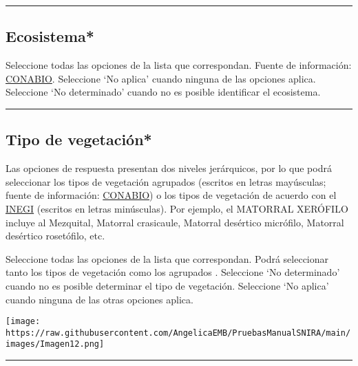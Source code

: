 \documentclass[
]{book}
\begin{document}
\begin{center}\rule{0.5\linewidth}{0.5pt}\end{center}

\hypertarget{ecosistema}{%
\subsection*{\texorpdfstring{{Ecosistema*}}{Ecosistema*}}\label{ecosistema}}

Seleccione todas las opciones de la lista que correspondan.
Fuente de información: \href{https://www.biodiversidad.gob.mx/ecosistemas/ecosismex}{CONABIO}.
Seleccione `No aplica' cuando ninguna de las opciones aplica.
Seleccione `No determinado' cuando no es posible identificar el ecosistema.

\begin{center}\rule{0.5\linewidth}{0.5pt}\end{center}

\hypertarget{tipo-de-vegetaciuxf3n}{%
\subsection*{\texorpdfstring{{Tipo de vegetación*}}{Tipo de vegetación*}}\label{tipo-de-vegetaciuxf3n}}

Las opciones de respuesta presentan dos niveles jerárquicos, por lo que podrá seleccionar los tipos de vegetación agrupados (escritos en letras mayúsculas; fuente de información: \href{https://www.biodiversidad.gob.mx/ecosistemas/ecosismex}{CONABIO}) o los tipos de vegetación de acuerdo con el \href{https://www.inegi.org.mx/temas/usosuelo/\#Documentacion}{INEGI} (escritos en letras minúsculas). Por ejemplo, el MATORRAL XERÓFILO incluye al Mezquital, Matorral crasicaule, Matorral desértico micrófilo, Matorral desértico rosetófilo, etc.

Seleccione todas las opciones de la lista que correspondan. Podrá seleccionar tanto los tipos de vegetación como los agrupados .
Seleccione `No determinado' cuando no es posible determinar el tipo de vegetación.
Seleccione `No aplica' cuando ninguna de las otras opciones aplica.

\texttt{[image: https://raw.githubusercontent.com/AngelicaEMB/PruebasManualSNIRA/main/images/Imagen12.png]}

\begin{center}\rule{0.5\linewidth}{0.5pt}\end{center}
\end{document}

